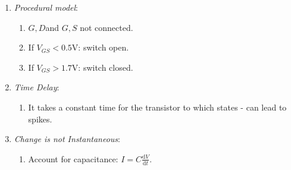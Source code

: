 \documentclass[twocolumn,english]{article}
\begin{document}
\begin{table}[H]
\noindent \begin{minipage}[t]{0.1\textwidth}


\noindent \end{minipage}
\begin{minipage}[c]{0.4\textwidth}
\begin{enumerate}
\item \noindent \emph{Procedural model}:

\begin{enumerate}
\item $G,D$and $G,S$ not connected.
\item If $V_{GS}<0.5$V: switch open.
\item If $V_{GS}>1.7$V: switch closed.
\end{enumerate}
\item \emph{Time Delay}:

\begin{enumerate}
\item It takes a constant time for the transistor to which states - can
lead to spikes.
\end{enumerate}
\item \emph{Change is not Instantaneous}:

\begin{enumerate}
\item Account for capacitance: $I=C\frac{\mbox{d}V}{\mbox{d}t}$.
\end{enumerate}
\end{enumerate}
\noindent \centering{}\end{minipage}
\end{table}
\end{document}
